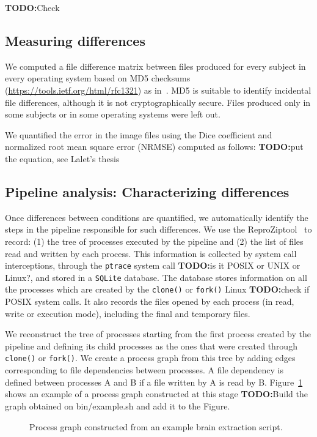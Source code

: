 \documentclass{article}
\newcommand{\todo}[1]{\color{red}\textbf{TODO:}#1\color{black}}
\newcommand{\reprozip}[0]{ReproZip}
\begin{document}
\todo{Check ~\cite{DBLP:journals/fini/DasGRSPMSRSKMKR17}}

\subsection{Measuring differences}



We computed a file difference matrix between files produced for every
subject in every operating system based on MD5 checksums~\cite{md5}
(\url{https://tools.ietf.org/html/rfc1321}) as
in~\cite{Scaria2017}. MD5 is suitable to identify incidental file
differences, although it is not cryptographically secure. Files
produced only in some subjects or in some operating systems were left out.

We quantified the error in the image files using the Dice coefficient and normalized root mean square error (NRMSE) computed as follows:
\todo{put the equation, see Lalet's thesis}

\subsection{Pipeline analysis: Characterizing differences}

Once differences between conditions are quantified, we automatically
identify the steps in the pipeline responsible for such differences.
We use the \reprozip tool~\cite{reprozip} to record: (1) the tree of
processes executed by the pipeline and (2) the list of files read and
written by each process. This information is collected by system call
interceptions, through the \texttt{ptrace} system call \todo{is it
  POSIX or UNIX or Linux?}, and stored in a \texttt{SQLite}
database. The database stores information on all the processes which
are created by the \texttt{clone()} or \texttt{fork()} Linux
\todo{check if POSIX} system calls. It also records the files opened by each process (in read, write or execution mode), including the final and
temporary files.

We reconstruct the tree of processes starting from the first process
created by the pipeline and defining its child processes as the ones
that were created through \texttt{clone()} or \texttt{fork()}. We
create a process graph from this tree by adding edges corresponding to
file dependencies between processes. A file dependency is defined
between processes A and B if a file written by A is read by
B. Figure~\ref{fig:graph-example} shows an example of a process graph
constructed at this stage \todo{Build the graph obtained on
  bin/example.sh and add it to the Figure}.
\begin{figure}
  \caption{Process graph constructed from an example brain extraction script.}
  \label{fig:graph-example}
\end{figure}
\end{document}

